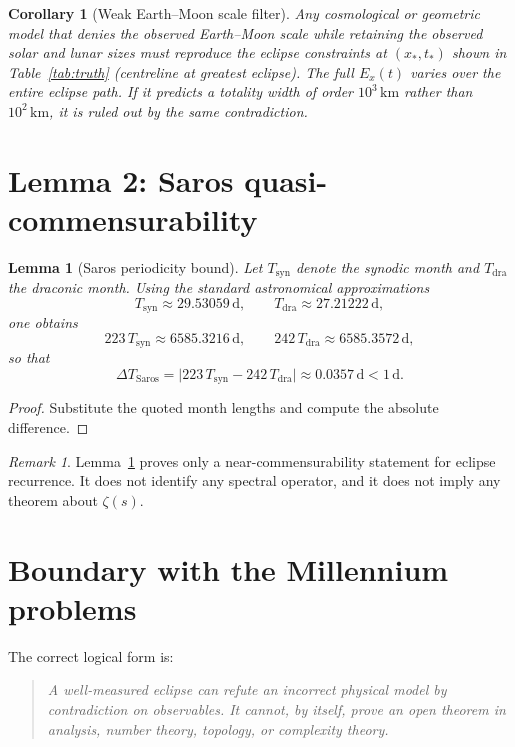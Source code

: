 \documentclass[11pt]{article}
\newtheorem{lemma}[theorem]{Lemma}
\newtheorem{corollary}[theorem]{Corollary}
\theoremstyle{definition}
\theoremstyle{remark}
\newtheorem{remark}[theorem]{Remark}
\begin{document}
\begin{corollary}[Weak Earth--Moon scale filter]
Any cosmological or geometric model that denies the observed Earth--Moon scale
while retaining the observed solar and lunar sizes must reproduce the eclipse
constraints at $(x_\ast, t_\ast)$ shown in Table~\ref{tab:truth} (centreline
at greatest eclipse). The full $E_x(t)$ varies over the entire eclipse path.
If it predicts a totality width of
order \(10^3\,\mathrm{km}\) rather than \(10^2\,\mathrm{km}\), it is ruled
out by the same contradiction.
\end{corollary}

\section{Lemma 2: Saros quasi-commensurability}

\begin{lemma}[Saros periodicity bound]\label{lem:saros}
Let \(T_{\mathrm{syn}}\) denote the synodic month and
\(T_{\mathrm{dra}}\) the draconic month. Using the standard astronomical
approximations
\[
T_{\mathrm{syn}}\approx 29.53059\,\mathrm{d},
\qquad
T_{\mathrm{dra}}\approx 27.21222\,\mathrm{d},
\]
one obtains
\[
223\,T_{\mathrm{syn}}\approx 6585.3216\,\mathrm{d},
\qquad
242\,T_{\mathrm{dra}}\approx 6585.3572\,\mathrm{d},
\]
so that
\[
\Delta T_{\mathrm{Saros}}
=\bigl|223\,T_{\mathrm{syn}}-242\,T_{\mathrm{dra}}\bigr|
\approx 0.0357\,\mathrm{d}<1\,\mathrm{d}.
\]
\end{lemma}

\begin{proof}
Substitute the quoted month lengths and compute the absolute difference.
\end{proof}

\begin{remark}
Lemma~\ref{lem:saros} proves only a near-commensurability statement for eclipse
recurrence. It does not identify any spectral operator, and it does not imply
any theorem about \(\zeta(s)\).
\end{remark}

\section{Boundary with the Millennium problems}

The correct logical form is:
\begin{quote}
\emph{A well-measured eclipse can refute an incorrect physical model by
contradiction on observables. It cannot, by itself, prove an open theorem in
analysis, number theory, topology, or complexity theory.}
\end{quote}
\end{document}
